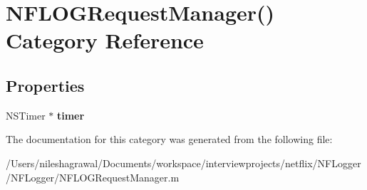 \hypertarget{category_n_f_l_o_g_request_manager_07_08}{}\section{N\+F\+L\+O\+G\+Request\+Manager() Category Reference}
\label{category_n_f_l_o_g_request_manager_07_08}
\subsection*{Properties}
\begin{DoxyCompactItemize}
\item 
\mbox{\label{category_n_f_l_o_g_request_manager_07_08_a486fe35fccb754a3e9c98109860443c3}} 
N\+S\+Timer $\ast$ {\bfseries timer}
\end{DoxyCompactItemize}


The documentation for this category was generated from the following file\+:\begin{DoxyCompactItemize}
\item 
/\+Users/nileshagrawal/\+Documents/workspace/interviewprojects/netflix/\+N\+F\+Logger/\+N\+F\+Logger/N\+F\+L\+O\+G\+Request\+Manager.\+m\end{DoxyCompactItemize}
